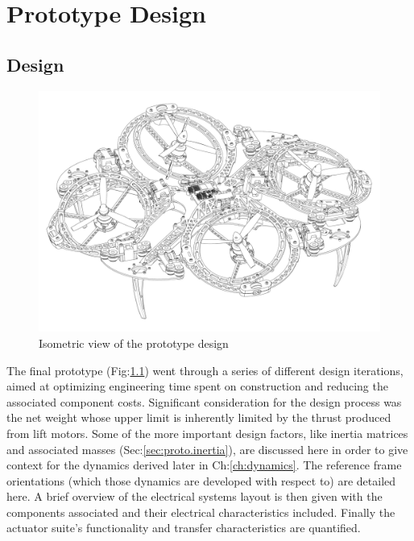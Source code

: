 \chapter{Prototype Design}
\label{ch:proto}
\section{Design}
\label{sec:proto.design}
\begin{figure}[htbp]
\centering
\includegraphics[width=\textwidth]{pdfpages/iso-design.pdf}
\vspace{-34pt}
\caption{Isometric view of the prototype design}
\vspace{-4pt}
\label{fig:iso-design}
\end{figure}
\par
The final prototype (Fig:\ref{fig:iso-design}) went through a series of different design iterations, aimed at optimizing engineering time spent on construction and reducing the associated component costs. Significant consideration for the design process was the net weight whose upper limit is inherently limited by the thrust produced from lift motors. Some of the more important design factors, like inertia matrices and associated masses (Sec:\ref{sec:proto.inertia}), are discussed here in order to give context for the dynamics derived later in Ch:\ref{ch:dynamics}. The reference frame orientations (which those dynamics are developed with respect to) are detailed here. A brief overview of the electrical systems layout is then given with the components associated and their electrical characteristics included. Finally the actuator suite's functionality and transfer characteristics are quantified.
